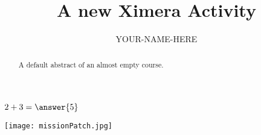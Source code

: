 \documentclass{ximera}
\title{A new Ximera Activity}
\author{YOUR-NAME-HERE}
\begin{document}
\begin{abstract}
    A default abstract of an almost empty course.
\end{abstract}
\maketitle


\begin{exercise}
    $2+3=\answer{5}$
\end{exercise}

\begin{image} %
    \texttt{[image: missionPatch.jpg]}  %
\end{image}
\end{document}
